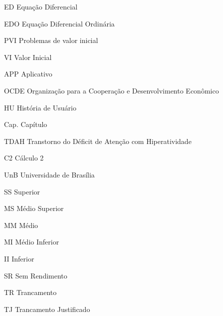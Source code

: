\begin{siglas}
  \item[ED] Equação Diferencial
  \item[EDO] Equação Diferencial Ordinária
  \item[PVI] Problemas de valor inicial
  \item[VI] Valor Inicial
  \item[APP] Aplicativo
  \item[OCDE] Organização para a Cooperação e Desenvolvimento Econômico
  \item[HU] História de Usuário
  \item[Cap.] Capítulo
  \item[TDAH] Transtorno do Déficit de Atenção com Hiperatividade 
  \item[C2] Cálculo 2
  \item[UnB] Universidade de Brasília
  \item[SS] Superior  
  \item[MS] Médio Superior
  \item[MM] Médio 
  \item[MI] Médio Inferior
  \item[II] Inferior  
  \item[SR] Sem Rendimento 
  \item[TR] Trancamento
  \item[TJ] Trancamento Justificado 
\end{siglas}

